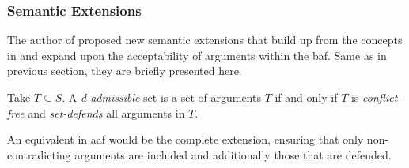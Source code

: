             
        \subsubsection{Semantic Extensions}
            The author of \autocite{Cayrol2005OnTA} proposed new semantic extensions that build up from the concepts in \autocite{Dung1995OnTA} and expand upon the acceptability of arguments within the \gls{baf}. Same as in previous section, they are briefly presented here.
            
            
            \begin{definition}
                Take $T \subseteq S$. A \textit{d-admissible} set is a set of arguments $T$ if and only if $T$ is \textit{conflict-free} and \textit{set-defends} all arguments in $T$.
                \label{definition:definition20}
            \end{definition}
            
            An equivalent in \gls{aaf} would be the complete extension, ensuring that only non-contradicting arguments are included and additionally those that are defended.
            
            
